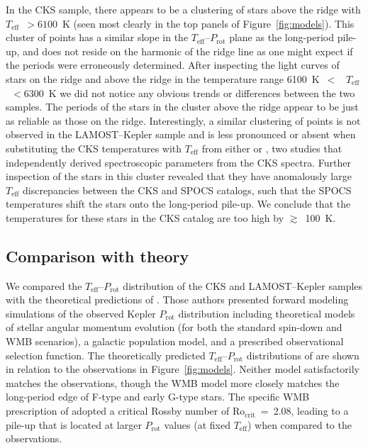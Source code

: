 \documentclass[linenumbers,tighten,trackchanges,twocolumn]{aastex631}
\newcommand{\rocrit}{$\mathrm{Ro_{crit}}$\xspace}
\newcommand{\teff}{\ensuremath{T_{\mathrm{eff}}}\xspace}
\newcommand{\prot}{\ensuremath{P_\mathrm{rot}}\xspace}
\begin{document}
In the CKS sample, there appears to be a clustering of stars above the ridge with \teff~$>6100$~K (seen most clearly in the top panels of Figure~\ref{fig:models}). This cluster of points has a similar slope in the \teff--\prot plane as the long-period pile-up, and does not reside on the harmonic of the ridge line as one might expect if the periods were erroneously determined. After inspecting the light curves of stars on the ridge and above the ridge in the temperature range 6100~K~$<$~ \teff~$<6300$~K we did not notice any obvious trends or differences between the two samples. The periods of the stars in the cluster above the ridge appear to be just as reliable as those on the ridge. Interestingly, a similar clustering of points is not observed in the LAMOST--Kepler sample and is less pronounced or absent when substituting the CKS temperatures with \teff from either \citet{Brewer2018} or \citet{Martinez2019}, two studies that independently derived spectroscopic parameters from the CKS spectra. Further inspection of the stars in this cluster revealed that they have anomalously large \teff discrepancies between the CKS and SPOCS catalogs, such that the SPOCS temperatures shift the stars onto the long-period pile-up. We conclude that the temperatures for these stars in the CKS catalog are too high by $\gtrsim$~100~K.

\subsection{Comparison with theory}
\label{subsec:models}

We compared the \teff--\prot distribution of the CKS and LAMOST--Kepler samples with the theoretical predictions of \citet{vanSaders2019}. Those authors presented forward modeling simulations of the observed Kepler \prot distribution including theoretical models of stellar angular momentum evolution (for both the standard spin-down and WMB scenarios), a galactic population model, and a prescribed observational selection function. The theoretically predicted \teff--\prot distributions of \citet{vanSaders2019} are shown in relation to the observations in Figure~\ref{fig:models}. Neither model satisfactorily matches the observations, though the WMB model more closely matches the long-period edge of F-type and early G-type stars. The specific WMB prescription of \citet{vanSaders2019} adopted a critical Rossby number of \rocrit~=~2.08, leading to a pile-up that is located at larger \prot values (at fixed \teff) when compared to the observations. 
\end{document}
